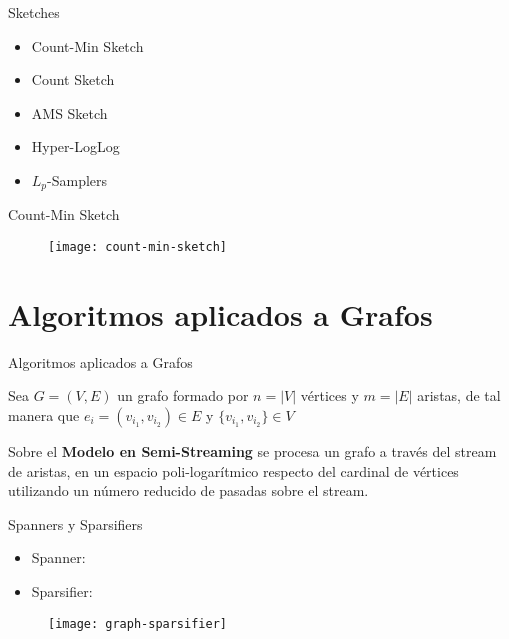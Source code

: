 \documentclass[12pt]{beamer}
\begin{document}
    \begin{frame}[fragile]{Sketches}

      \begin{itemize}
        \item Count-Min Sketch
        \item Count Sketch
        \item AMS Sketch
        \item Hyper-LogLog
        \item $L_p$-Samplers
      \end{itemize}

    \end{frame}


    \begin{frame}[fragile]{Count-Min Sketch}

      \begin{figure}
        \texttt{[image: count-min-sketch]}
        \caption{}
        \label{}
      \end{figure}

    \end{frame}

  \section{Algoritmos aplicados a Grafos}

    \begin{frame}[fragile]{Algoritmos aplicados a Grafos}

      Sea $G=(V,E)$ un grafo formado por $n=|V|$ vértices y $m=|E|$ aristas, de tal manera que $e_i = (v_{i_1},v_{i_2}) \in E$ y $\{v_{i_1},v_{i_2}\} \in V$

      Sobre el \textbf{Modelo en Semi-Streaming} se procesa un grafo a través del stream de aristas, en un espacio poli-logarítmico respecto del cardinal de vértices utilizando un número reducido de pasadas sobre el stream.

    \end{frame}

    \begin{frame}[fragile]{Spanners y Sparsifiers}

      \begin{itemize}
        \item Spanner:
        \item Sparsifier:
      \end{itemize}

      \begin{figure}
        \texttt{[image: graph-sparsifier]}
        \caption{}
        \label{}
      \end{figure}

    \end{frame}
\end{document}
